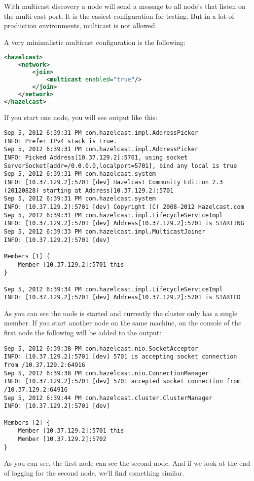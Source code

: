 With multicast discovery a node will send a message to all node's that listen on the multi-cast port. It is the easiest configuration for testing. But in a lot of production environments, multicast is not allowed.

A very minimalistic multicast configuration is the following:
\begin{lstlisting}[language=xml]
<hazelcast>
    <network>
        <join>
            <multicast enabled="true"/>
        </join>
    </network>
</hazelcast>
\end{lstlisting}

If you start one node, you will see output like this:
\begin{verbatim}
Sep 5, 2012 6:39:31 PM com.hazelcast.impl.AddressPicker
INFO: Prefer IPv4 stack is true.
Sep 5, 2012 6:39:31 PM com.hazelcast.impl.AddressPicker
INFO: Picked Address[10.37.129.2]:5701, using socket ServerSocket[addr=/0.0.0.0,localport=5701], bind any local is true
Sep 5, 2012 6:39:31 PM com.hazelcast.system
INFO: [10.37.129.2]:5701 [dev] Hazelcast Community Edition 2.3 (20120828) starting at Address[10.37.129.2]:5701
Sep 5, 2012 6:39:31 PM com.hazelcast.system
INFO: [10.37.129.2]:5701 [dev] Copyright (C) 2008-2012 Hazelcast.com
Sep 5, 2012 6:39:31 PM com.hazelcast.impl.LifecycleServiceImpl
INFO: [10.37.129.2]:5701 [dev] Address[10.37.129.2]:5701 is STARTING
Sep 5, 2012 6:39:33 PM com.hazelcast.impl.MulticastJoiner
INFO: [10.37.129.2]:5701 [dev] 

Members [1] {
    Member [10.37.129.2]:5701 this
}

Sep 5, 2012 6:39:34 PM com.hazelcast.impl.LifecycleServiceImpl
INFO: [10.37.129.2]:5701 [dev] Address[10.37.129.2]:5701 is STARTED
\end{verbatim}	

As you can see the node is started and currently the cluster only has a single member. If you start another node on the same machine, on the console of the first node the following will be added to the output:

\begin{verbatim}
Sep 5, 2012 6:39:38 PM com.hazelcast.nio.SocketAcceptor
INFO: [10.37.129.2]:5701 [dev] 5701 is accepting socket connection from /10.37.129.2:64916
Sep 5, 2012 6:39:38 PM com.hazelcast.nio.ConnectionManager
INFO: [10.37.129.2]:5701 [dev] 5701 accepted socket connection from /10.37.129.2:64916
Sep 5, 2012 6:39:44 PM com.hazelcast.cluster.ClusterManager
INFO: [10.37.129.2]:5701 [dev] 

Members [2] {
    Member [10.37.129.2]:5701 this
    Member [10.37.129.2]:5702
}
\end{verbatim}	
As you can see, the first node can see the second node. And if we look at the end of logging for the second node, we'll find something similar.


